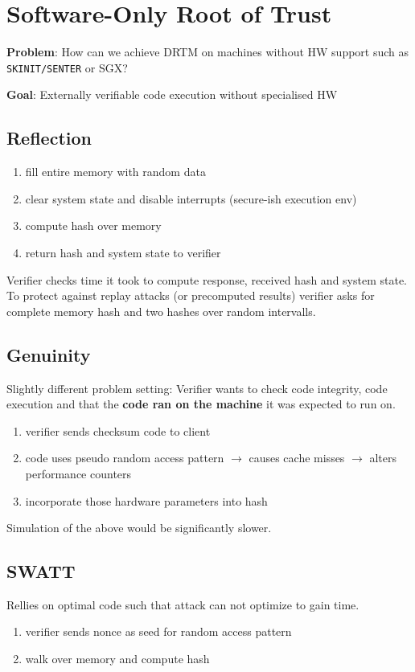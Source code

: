 \section{Software-Only Root of Trust}
\textbf{Problem}: How can we achieve DRTM on machines without HW support such as \texttt{SKINIT/SENTER} or SGX?

\textbf{Goal}: Externally verifiable code execution without specialised HW
\subsection{Reflection}
\begin{enumerate}
    \item fill entire memory with random data
    \item clear system state and disable interrupts (secure-ish execution env)
    \item compute hash over memory
    \item return hash and system state to verifier
\end{enumerate}

Verifier checks time it took to compute response, received hash and system state.
To protect against replay attacks (or precomputed results) verifier asks for complete memory hash and two hashes over random intervalls.

\subsection{Genuinity}
Slightly different problem setting: Verifier wants to check code integrity, code execution and that the \textbf{code ran on the machine} it was expected to run on.

\begin{enumerate}
    \item verifier sends checksum code to client
    \item code uses pseudo random access pattern $\xrightarrow{}$ causes cache misses $\xrightarrow{}$ alters performance counters
    \item incorporate those hardware parameters into hash
\end{enumerate}

Simulation of the above would be significantly slower.

\subsection{SWATT}
Rellies on optimal code such that attack can not optimize to gain time.
\begin{enumerate}
    \item verifier sends nonce as seed for random access pattern
    \item walk over memory and compute hash
\end{enumerate}

